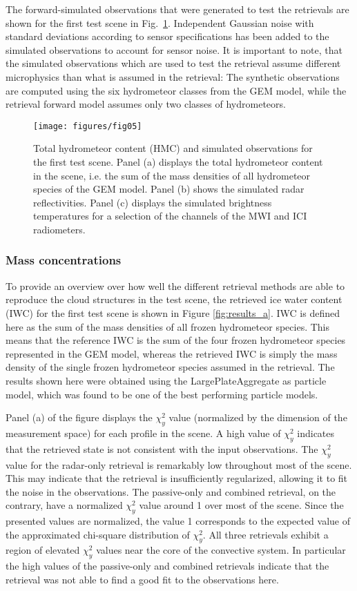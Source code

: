 \documentclass[journal abbreviation, manuscript]{copernicus}
\begin{document}
The forward-simulated observations that were generated to test the retrievals
are shown for the first test scene in Fig.~\ref{fig:observations_a}. Independent
Gaussian noise with standard deviations according to sensor specifications has
been added to the simulated observations to account for sensor noise. It is
important to note, that the simulated observations which are used to test the
retrieval assume different microphysics than what is assumed in the retrieval:
The synthetic observations are computed using the six hydrometeor classes from
the GEM model, while the retrieval forward model assumes only two classes of
hydrometeors.

\begin{figure}
\centering
\texttt{[image: figures/fig05]}
\caption{Total hydrometeor content (HMC) and simulated observations for the first test
  scene. Panel (a) displays the total hydrometeor content in the scene, i.e. the
  sum of the mass densities of all hydrometeor species of the GEM model. Panel
  (b) shows the simulated radar reflectivities. Panel (c) displays the simulated
  brightness temperatures for a selection of the channels of the MWI and ICI
  radiometers.}
\label{fig:observations_a}
\end{figure}

\subsubsection{Mass concentrations}

To provide an overview over how well the different retrieval methods are able to
reproduce the cloud structures in the test scene, the retrieved ice water
content (IWC) for the first test scene is shown in Figure \ref{fig:results_a}.
IWC is defined here as the sum of the mass densities of all frozen hydrometeor
species. This means that the reference IWC is the sum of the four frozen
hydrometeor species represented in the GEM model, whereas the retrieved IWC is
simply the mass density of the single frozen hydrometeor species assumed in the
retrieval. The results shown here were obtained using the LargePlateAggregate as
particle model, which was found to be one of the best performing particle
models.

Panel (a) of the figure displays the $\chi^2_y$ value (normalized by the
dimension of the measurement space) for each profile in the scene. A high value
of $\chi^2_y$ indicates that the retrieved state is not consistent with the
input observations. The $\chi^2_y$ value for the radar-only retrieval is
remarkably low throughout most of the scene. This may indicate that the
retrieval is insufficiently regularized, allowing it to fit the noise in the
observations. The passive-only and combined retrieval, on the contrary, have a
normalized $\chi^2_y$ value around 1 over most of the scene. Since the presented
values are normalized, the value 1 corresponds to the expected value of the
approximated chi-square distribution of $\chi^2_y$. All three retrievals exhibit
a region of elevated $\chi^2_y$ values near the core of the convective system.
In particular the high values of the passive-only and combined retrievals
indicate that the retrieval was not able to find a good fit to the observations
here.
\end{document}
